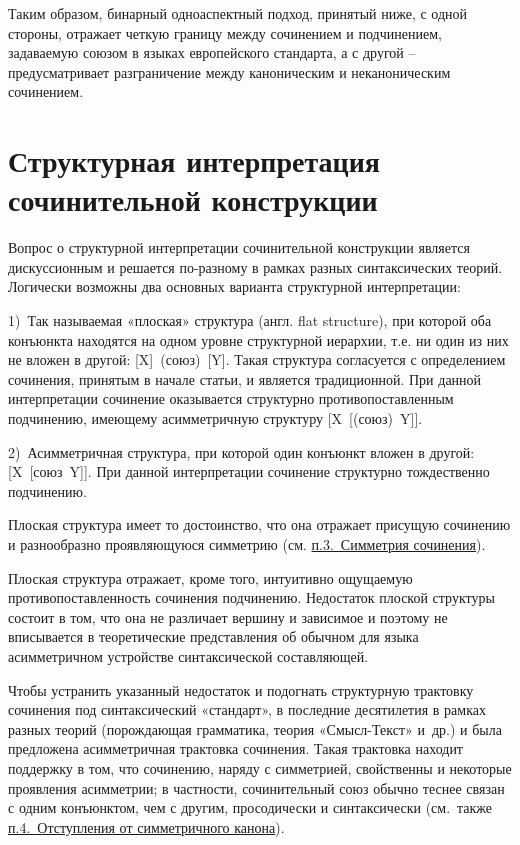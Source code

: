 Таким образом, бинарный одноаспектный подход, принятый ниже, с одной
стороны, отражает четкую границу между сочинением и подчинением,
задаваемую союзом в языках европейского стандарта, а с другой --
предусматривает разграничение между каноническим и неканоническим
сочинением.

\section{Структурная интерпретация сочинительной
  конструкции}\label{ux441ux442ux440ux443ux43aux442ux443ux440ux43dux430ux44f-ux438ux43dux442ux435ux440ux43fux440ux435ux442ux430ux446ux438ux44f-ux441ux43eux447ux438ux43dux438ux442ux435ux43bux44cux43dux43eux439-ux43aux43eux43dux441ux442ux440ux443ux43aux446ux438ux438}

Вопрос о структурной интерпретации сочинительной конструкции является
дискуссионным и решается по-разному в рамках разных синтаксических
теорий. Логически возможны два основных варианта структурной
интерпретации:

1)~Так называемая «плоская» структура (англ. flat structure), при
которой оба конъюнкта находятся на одном уровне структурной иерархии,
т.е. ни один из них не вложен в другой: {[}X{]}~(союз)~{[}Y{]}. Такая
структура согласуется с определением сочинения, принятым в начале
статьи, и является традиционной. При данной интерпретации сочинение
оказывается структурно противопоставленным подчинению, имеющему
асимметричную структуру {[}X~{[}(союз)~Y{]}{]}.

2)~Асимметричная структура, при которой один конъюнкт вложен в другой:
{[}X~{[}союз~Y{]}{]}. При данной интерпретации сочинение структурно
тождественно подчинению.

Плоская структура имеет то достоинство, что она отражает присущую
сочинению и разнообразно проявляющуюся симметрию (см.
\underline{п.3.~Симметрия сочинения}).

Плоская структура отражает, кроме того, интуитивно ощущаемую
противопоставленность сочинения подчинению. Недостаток плоской структуры
состоит в том, что она не различает вершину и зависимое и поэтому не
вписывается в теоретические представления об обычном для языка
асимметричном устройстве синтаксической составляющей.

Чтобы устранить указанный недостаток и подогнать структурную трактовку
сочинения под синтаксический «стандарт», в последние десятилетия в
рамках разных теорий (порождающая грамматика, теория «Смысл-Текст»
и~др.) и была предложена асимметричная трактовка сочинения. Такая
трактовка находит поддержку в том, что сочинению, наряду с симметрией,
свойственны и некоторые проявления асимметрии; в частности,
сочинительный союз обычно теснее связан с одним конъюнктом, чем с
другим, просодически и синтаксически (см.~также
\underline{п.4.~Отступления от симметричного канона}).

